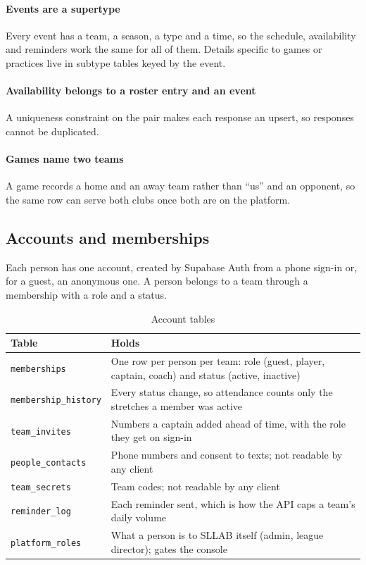 \documentclass[letterpaper,11pt]{article}
\newcommand{\code}[1]{\texttt{#1}}
\begin{document}
\paragraph{Events are a supertype} Every event has a team, a season, a type and a time, so the
schedule, availability and reminders work the same for all of them. Details specific to games or
practices live in subtype tables keyed by the event.

\paragraph{Availability belongs to a roster entry and an event} A uniqueness constraint on the
pair makes each response an upsert, so responses cannot be duplicated.

\paragraph{Games name two teams} A game records a home and an away team rather than ``us'' and an
opponent, so the same row can serve both clubs once both are on the platform.

\subsection{Accounts and memberships}

Each person has one account, created by Supabase Auth from a phone sign-in or, for a guest, an
anonymous one. A person belongs to a team through a membership with a role and a status.

\begin{table}[H]
\caption{Account tables}\label{t:accounts}
\footnotesize
\begin{tabularx}{\linewidth}{@{}l X@{}}
\toprule
Table & Holds \\
\midrule
\code{memberships} & One row per person per team: role (guest, player, captain, coach) and status (active, inactive) \\
\code{membership\_history} & Every status change, so attendance counts only the stretches a member was active \\
\code{team\_invites} & Numbers a captain added ahead of time, with the role they get on sign-in \\
\code{people\_contacts} & Phone numbers and consent to texts; not readable by any client \\
\code{team\_secrets} & Team codes; not readable by any client \\
\code{reminder\_log} & Each reminder sent, which is how the API caps a team's daily volume \\
\code{platform\_roles} & What a person is to SLLAB itself (admin, league director); gates the console \\
\bottomrule
\end{tabularx}
\end{table}
\end{document}
